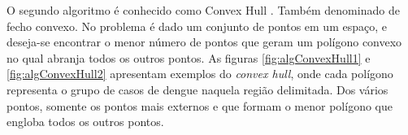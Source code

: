 O segundo algoritmo é conhecido como Convex Hull \cite{ConvexHull}. Também denominado de fecho convexo. No problema é dado um conjunto de pontos em um espaço, e deseja-se encontrar o menor número de pontos que geram um polígono convexo no qual abranja todos os outros pontos.
As figuras \ref{fig:algConvexHull1} e \ref{fig:algConvexHull2} apresentam exemplos do \emph{convex hull}, onde cada polígono representa o grupo de casos de dengue naquela região delimitada. Dos vários pontos, somente os pontos mais externos e que formam o menor polígono que engloba todos os outros pontos.
%
\begin{figure}[!ht]
	\centering	
\end{figure}
\FloatBarrier
\begin{figure}[!ht]
	\centering	
\end{figure}
\FloatBarrier
